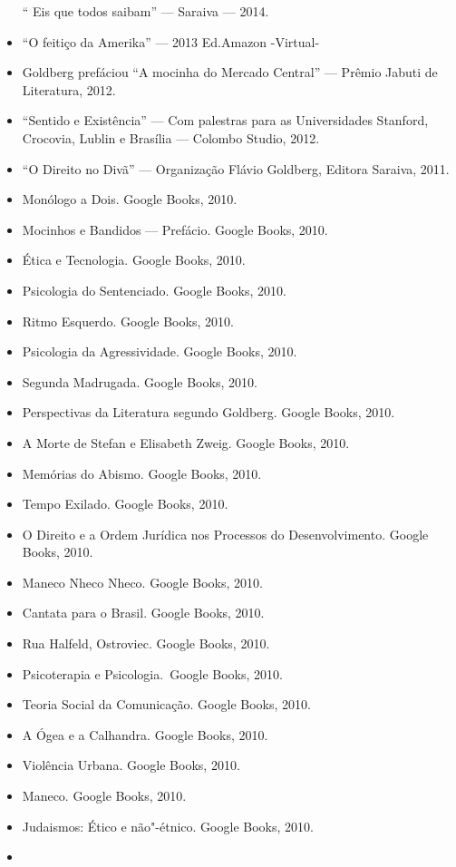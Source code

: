 \begin{itemize}
  `` Eis que todos saibam'' ---  Saraiva --- 2014.
\item
  ``O feitiço da Amerika'' --- 2013 Ed.Amazon -Virtual-
\item
  Goldberg prefáciou ``A mocinha do Mercado Central'' --- Prêmio Jabuti
  de Literatura, 2012.
\item
  ``Sentido e Existência'' --- Com palestras para as Universidades
  Stanford, Crocovia, Lublin e Brasília --- Colombo Studio, 2012.
\item
  ``O Direito no Divã'' --- Organização Flávio Goldberg, Editora
  Saraiva, 2011.
\item
  Monólogo a Dois. Google Books, 2010.
\item
  Mocinhos e Bandidos --- Prefácio. Google Books, 2010.
\item
  Ética e Tecnologia. Google Books, 2010.
\item
  Psicologia do Sentenciado. Google Books, 2010.
\item
  Ritmo Esquerdo. Google Books, 2010.
\item
  Psicologia da Agressividade. Google Books, 2010.
\item
  Segunda Madrugada. Google Books, 2010.
\item
  Perspectivas da Literatura segundo Goldberg. Google Books, 2010.
\item
  A Morte de Stefan e Elisabeth Zweig. Google Books, 2010.
\item
  Memórias do Abismo. Google Books, 2010.
\item
  Tempo Exilado. Google Books, 2010.
\item
  O Direito e a Ordem Jurídica nos Processos do Desenvolvimento. Google
  Books, 2010.
\item
  Maneco Nheco Nheco. Google Books, 2010.
\item
  Cantata para o Brasil. Google Books, 2010.
\item
  Rua Halfeld, Ostroviec. Google Books, 2010.
\item
  Psicoterapia e Psicologia.~Google Books, 2010.
\item
  Teoria Social da Comunicação. Google Books, 2010.
\item
  A Ógea e a Calhandra. Google Books, 2010.
\item
  Violência Urbana. Google Books, 2010.
\item
  Maneco. Google Books, 2010.
\item
  Judaismos: Ético e não"-étnico. Google Books, 2010.
\item

\end{itemize}
